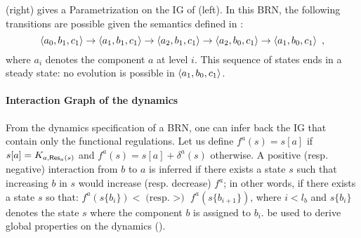 \begin{example}
(right) gives a Parametrization on the IG of (left).
In this BRN, the following transitions are possible given the semantics defined in :
$$\mbox{$\langle a_0, b_1, c_1 \rangle$} \rightarrow \mbox{$\langle a_1, b_1, c_1 \rangle$} \rightarrow \mbox{$\langle a_2, b_1, c_1 \rangle$} \rightarrow
\mbox{$\langle a_2, b_0, c_1 \rangle$} \rightarrow \mbox{$\langle a_1, b_0, c_1 \rangle$} \enspace,$$
where $a_i$ denotes the component $a$ at level $i$.
This sequence of states ends in a steady state: no evolution is possible in $\mbox{$\langle a_1, b_0, c_1 \rangle$}$.
\end{example}

\begin{remark}
\label{rem:K-equiv}
\end{remark}


\paragraph{Interaction Graph of the dynamics}
From the dynamics specification of a BRN, one can infer back the IG that contain only the functional
regulations.
Let us define
$f^a(s) = s[a]$ if $s[a] = K_{a, \mathsf{Res}_{a}(s)}$
and
$f^a(s) = s[a]+\delta^a(s)$ otherwise.
A positive (resp. negative) interaction from $b$ to $a$ is inferred if there exists a state $s$ such
that increasing $b$ in $s$ would increase (resp. decrease) $f^a$; in other words, if
there exists a state $s$ so that:
$f^a(s\{b_i\}) < \text{(resp. $>$) } f^a(s\{b_{i+1}\})$, 
where $i < l_b$ and $s\{b_i\}$ denotes the state $s$ where the component $b$ is assigned to $b_i$.
 be used to derive global properties on
the dynamics (\eg \cite{Richard2010378,PR11-SASB}).

